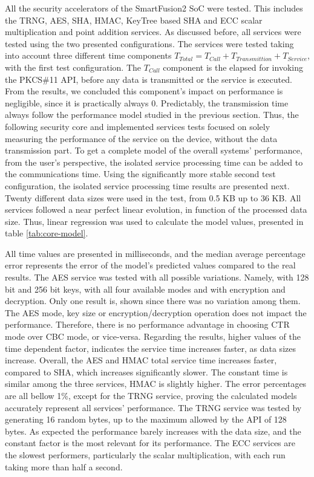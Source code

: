 All the security accelerators of the SmartFusion2 SoC were tested. This includes the TRNG, AES, SHA, HMAC, KeyTree based SHA and ECC scalar multiplication and point addition services.
As discussed before, all services were tested using the two presented configurations. The services were tested taking into account three different time components \(T_{Total} = T_{Call} + T_{Transmittion} + T_{Service}\), with the first test configuration. The \(T_{Call}\) component is the elapsed for invoking the PKCS\#11 API, before any data is transmitted or the service is executed. From the results, we concluded this component's impact on performance is negligible, since it is practically always 0.
Predictably, the transmission time always follow the performance model studied in the previous section.
Thus, the following security core and implemented services tests focused on solely measuring the performance of the service on the device, without the data transmission part. To get a complete model of the overall systems' performance, from the user's perspective, the isolated service processing time can be added to the communications time.
Using the significantly more stable second test configuration, the isolated service processing time results are presented next.
Twenty different data sizes were used in the test, from 0.5 KB up to 36 KB.
All services followed a near perfect linear evolution, in function of the processed data size. Thus, linear regression was used to calculate the model values, presented in table \ref{tab:core-model}.



All time values are presented in milliseconds, and the median average percentage error represents the error of the model's predicted values compared to the real results.
The AES service was tested with all possible variations. Namely, with 128 bit and 256 bit keys, with all four available modes and with encryption and decryption. Only one result is, shown since there was no variation among them. The AES mode, key size or encryption/decryption operation does not impact the performance. Therefore, there is no performance advantage in choosing CTR mode over CBC mode, or vice-versa.
Regarding the results, higher values of the time dependent factor, indicates the service time increases faster, as data sizes increase. Overall, the AES and HMAC total service time increases faster, compared to SHA, which increases significantly slower. The constant time is similar among the three services, HMAC is slightly higher.
The error percentages are all bellow 1\%, except for the TRNG service, proving the calculated models accurately represent all services' performance.
The TRNG service was tested by generating 16 random bytes, up to the maximum allowed by the API of 128 bytes. As expected the performance barely increases with the data size, and the constant factor is the most relevant for its performance.
The ECC services are the slowest performers, particularly the scalar multiplication, with each run taking more than half a second.

